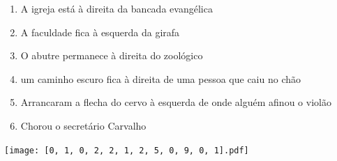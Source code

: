 \documentclass[12pt]{article}
\begin{document}
		 

\pagebreak


	\begin{enumerate}
		  \sffamily %
		  \large %


\vfill \item
A igreja está	%
à direita
da bancada evangélica	%

\vfill \item
A faculdade fica	%
à esquerda
da girafa	%

\vfill \item
O abutre permanece	%
à direita
do zoológico	%

\vfill \item
um caminho escuro fica	%
à direita
de uma pessoa que caiu no chão	%

\vfill \item
Arrancaram a flecha do cervo	%
à esquerda
de onde alguém afinou o violão	%

\vfill \item
Chorou	%
o secretário Carvalho	%
	\end{enumerate}
		  
		  \hfill

		  \vfill

\texttt{[image: [0, 1, 0, 2, 2, 1, 2, 5, 0, 9, 0, 1].pdf]}


	\hfill	  	  

\end{document}
